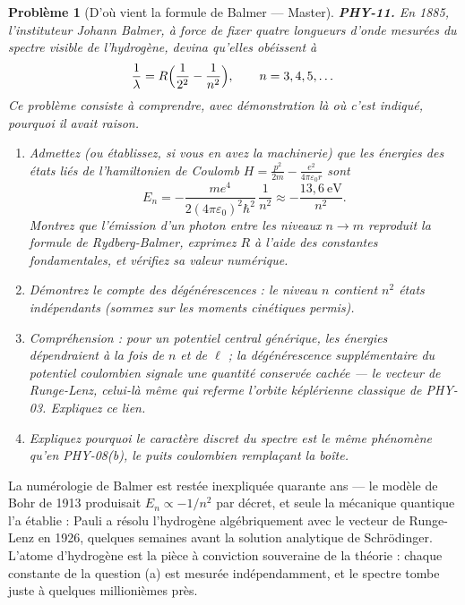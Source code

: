 \documentclass[11pt]{article}
\newtheorem{problem}{Problème}
\begin{document}
\bigskip

\begin{problem}[{D'où vient la formule de Balmer --- Master}]
\textbf{PHY-11.} En 1885, l'instituteur Johann Balmer, à force de fixer quatre longueurs d'onde
mesurées du spectre visible de l'hydrogène, devina qu'elles obéissent à
\[ \frac{1}{\lambda} = R\Bigl(\frac{1}{2^2} - \frac{1}{n^2}\Bigr), \qquad n = 3, 4, 5, \dots \]
Ce problème consiste à comprendre, avec démonstration là où c'est indiqué, pourquoi il avait
raison.
\begin{enumerate}
\item[(a)] Admettez (ou établissez, si vous en avez la machinerie) que les énergies des états liés de
l'hamiltonien de Coulomb $H = \frac{p^2}{2m} - \frac{e^2}{4\pi\varepsilon_0 r}$ sont
\[ E_n = -\frac{m e^4}{2(4\pi\varepsilon_0)^2\hbar^2}\,\frac{1}{n^2} \approx -\frac{13{,}6\ \text{eV}}{n^2}. \]
Montrez que l'émission d'un photon entre les niveaux $n \to m$ reproduit la formule de
Rydberg-Balmer, exprimez $R$ à l'aide des constantes fondamentales, et vérifiez sa valeur
numérique.
\item[(b)] Démontrez le compte des dégénérescences : le niveau $n$ contient $n^2$ états indépendants
(sommez sur les moments cinétiques permis).
\item[(c)] Compréhension : pour un potentiel central générique, les énergies dépendraient à la fois de
$n$ et de $\ell$ ; la dégénérescence supplémentaire du potentiel coulombien signale une
quantité conservée cachée --- le vecteur de Runge-Lenz, celui-là même qui referme l'orbite
képlérienne classique de PHY-03. Expliquez ce lien.
\item[(d)] Expliquez pourquoi le caractère discret du spectre est le même phénomène qu'en PHY-08(b), le
puits coulombien remplaçant la boîte.
\end{enumerate}

\end{problem}

\noindent La numérologie de Balmer est restée inexpliquée quarante ans --- le modèle de
Bohr de 1913 produisait $E_n \propto -1/n^2$ par décret, et seule la mécanique quantique l'a
établie : Pauli a résolu l'hydrogène algébriquement avec le vecteur de Runge-Lenz en 1926,
quelques semaines avant la solution analytique de Schrödinger. L'atome d'hydrogène est la pièce à
conviction souveraine de la théorie : chaque constante de la question (a) est mesurée
indépendamment, et le spectre tombe juste à quelques millionièmes près.
\end{document}
